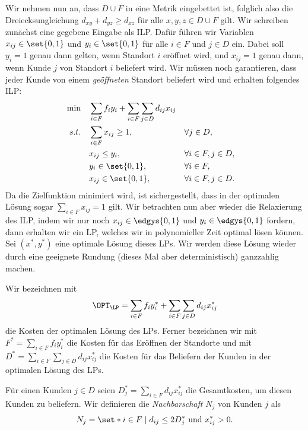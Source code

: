 \documentclass[language=ngerman,algolist]{TemplateLecture}
\begin{document}
Wir nehmen nun an, dass $D \cup F$ in eine Metrik eingebettet ist, folglich also die Dreiecksungleichung $d_{xy} + d_{yz} \geq d_{xz}$ für alle $x, y, z \in D \cup F$ gilt. Wir schreiben zunächst eine gegebene Eingabe als ILP. Dafür führen wir Variablen $x_{ij} \in \set{0,1}$ und $y_i \in \set{0,1}$ für alle $i \in F$ und $j \in D$ ein. Dabei soll $y_i = 1$ genau dann gelten, wenn Standort $i$ eröffnet wird, und $x_{ij} = 1$ genau dann, wenn Kunde $j$ von Standort $i$ beliefert wird. Wir müssen noch garantieren, dass jeder Kunde von einem \emph{geöffneten} Standort beliefert wird und erhalten folgendes ILP:
\begin{align*}
    \min \quad & \sum_{i \in F} f_i y_i + \sum_{i \in F} \sum_{j \in D} d_{ij} x_{ij} \\ 
    s.t. \quad & \sum_{i \in F} x_{ij} \geq 1, && \forall j \in D, \\
    & x_{ij} \leq y_{i}, && \forall i \in F, j \in D, \\
    & y_i \in \set{0,1}, && \forall i \in F, \\
    & x_{ij} \in \set{0,1}, && \forall i \in F, j \in D.
\end{align*}
Da die Zielfunktion minimiert wird, ist sichergestellt, dass in der optimalen Lösung sogar $\sum_{i \in F} x_{ij} = 1$ gilt. Wir betrachten nun aber wieder die Relaxierung des ILP, indem wir nur noch $x_{ij} \in \edgys{0,1}$ und $y_i \in \edgys{0,1}$ fordern, dann erhalten wir ein LP, welches wir in polynomieller Zeit optimal lösen können. Sei $(x^*, y^*)$ eine optimale Lösung dieses LPs. Wir werden diese Lösung wieder durch eine geeignete Rundung (dieses Mal aber deterministisch) ganzzahlig machen.

Wir bezeichnen mit
\begin{equation*}
    \OPT_{\LP} = \sum_{i \in F} f_i y_i^* + \sum_{i \in F} \sum_{j \in D} d_{ij} x_{ij}^*
\end{equation*}
die Kosten der optimalen Lösung des LPs. Ferner bezeichnen wir mit $F^* = \sum_{i \in F}  f_i y_i^*$ die Kosten für das Eröffnen der Standorte und mit $D^* = \sum_{i \in F} \sum_{j \in D} d_{ij} x_{ij}^*$ die Kosten für das Beliefern der Kunden in der optimalen Lösung des LPs.

Für einen Kunden $j \in D$ seien $D_j^* = \sum_{i \in F} d_{ij} x_{ij}^*$ die Gesamtkosten, um diesen Kunden zu beliefern. Wir definieren die \emph{Nachbarschaft} $N_j$ von Kunden $j$ als 
\begin{equation*}
    N_j = \set*{i \in F \mid d_{ij} \leq 2D_j^* \text{ und } x_{ij}^* > 0}. 
\end{equation*}
\end{document}
